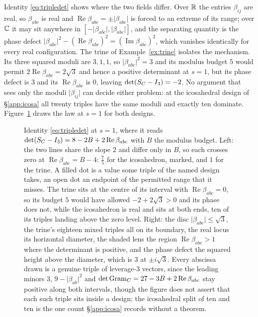 \begin{remark}\label{rem:phase}
Identity \eqref{eq:tripledet} shows where the two fields differ.
Over $\mathbb{R}$ the entries $\beta_{ij}$ are real, so $\beta_{abc}$ is real and
$\operatorname{Re}\beta_{abc}=\pm\lvert\beta_{abc}\rvert$ is forced to an extreme of its
range; over $\mathbb{C}$ it may sit anywhere in
$[-\lvert\beta_{abc}\rvert,\lvert\beta_{abc}\rvert]$, and the separating
quantity is the phase defect
$\lvert\beta_{abc}\rvert^{2}-(\operatorname{Re}\beta_{abc})^{2}=(\operatorname{Im}\beta_{abc})^{2}$,
which vanishes identically for every real configuration.  The trine of
Example~\ref{ex:trine} isolates the mechanism.  Its three squared moduli
are $3,1,1$, so $\lvert\beta_{abc}\rvert^{2}=3$ and its modulus budget
$5$ would permit $2\operatorname{Re}\beta_{abc}=2\sqrt3$ and hence a
positive determinant at $s=1$, but its phase defect is $3$ and its
$\operatorname{Re}\beta_{abc}$ is $0$, leaving $\det(S_{C}-I_3)=-2$.  No
argument that sees only the moduli $\lvert\beta_{ij}\rvert$ can decide
either problem: at the icosahedral design of \S\ref{app:icosa} all twenty
triples have the same moduli and exactly ten dominate.
Figure~\ref{fig:phasedefect} draws the law at $s=1$ for both designs.
\end{remark}

\begin{figure}[ht]
  \centering
  
  \caption{Identity \eqref{eq:tripledet} at $s=1$, where it reads
  $\det(S_{C}-I_3)=8-2B+2\operatorname{Re}\beta_{abc}$ with $B$ the modulus
  budget.  Left: the two lines share the slope $2$ and differ only in $B$, so
  each crosses zero at $\operatorname{Re}\beta_{abc}=B-4$: $\tfrac75$ for the
  icosahedron, marked, and $1$ for the trine.
  A filled dot is a value some triple of the named design takes, an open dot
  an endpoint of the permitted range that it misses.  The trine sits at the
  centre of its interval with $\operatorname{Re}\beta_{abc}=0$, so its budget
  $5$ would have allowed $-2+2\sqrt3>0$ and its phase does not, while the
  icosahedron is real and sits at both ends, ten of its triples landing above
  the zero level.  Right: the disc $\lvert\beta_{abc}\rvert\le\sqrt3$, the
  trine's eighteen mixed triples all on its boundary, the real locus its
  horizontal diameter, the shaded lens the region
  $\operatorname{Re}\beta_{abc}>1$ where the determinant is positive, and the
  phase defect the squared height above the diameter, which is $3$ at
  $\pm i\sqrt3$.  Every abscissa drawn is a genuine triple of leverage-$3$
  vectors, since the leading minors $3$, $9-\lvert\beta_{ab}\rvert^{2}$ and
  $\det\operatorname{Gram}_C=27-3B+2\operatorname{Re}\beta_{abc}$ stay
  positive along both intervals, though the figure does not assert that each
  such triple sits inside a design; the icosahedral split of ten and ten is the
  one count \S\ref{app:icosa} records without a theorem.}
  \label{fig:phasedefect}
\end{figure}

